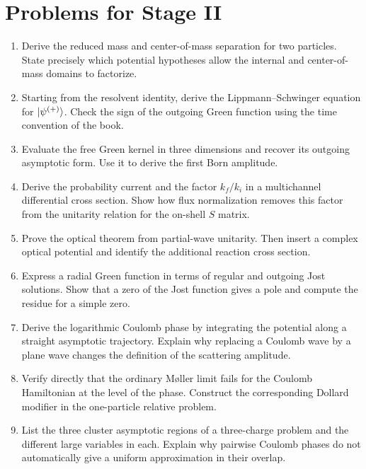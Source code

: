 \section{Problems for Stage II}
\label{problems:stage-II}

\begin{enumerate}[label=\textbf{II.\arabic*},leftmargin=*]
  \item Derive the reduced mass and center-of-mass separation for two
  particles.  State precisely which potential hypotheses allow the internal
  and center-of-mass domains to factorize.

  \item Starting from the resolvent identity, derive the Lippmann--Schwinger
  equation for $\lvert \psi^{(+)} \rangle$.  Check the sign of the outgoing Green
  function using the time convention of the book.

  \item Evaluate the free Green kernel in three dimensions and recover its
  outgoing asymptotic form.  Use it to derive the first Born amplitude.

  \item Derive the probability current and the factor $k_f/k_i$ in a
  multichannel differential cross section.  Show how flux normalization
  removes this factor from the unitarity relation for the on-shell $S$ matrix.

  \item Prove the optical theorem from partial-wave unitarity.  Then insert a
  complex optical potential and identify the additional reaction cross
  section.

  \item Express a radial Green function in terms of regular and outgoing Jost
  solutions.  Show that a zero of the Jost function gives a pole and compute
  the residue for a simple zero.

  \item Derive the logarithmic Coulomb phase by integrating the potential
  along a straight asymptotic trajectory.  Explain why replacing a Coulomb
  wave by a plane wave changes the definition of the scattering amplitude.

  \item Verify directly that the ordinary M{\o}ller limit fails for the
  Coulomb Hamiltonian at the level of the phase.  Construct the corresponding
  Dollard modifier in the one-particle relative problem.

  \item List the three cluster asymptotic regions of a three-charge problem
  and the different large variables in each.  Explain why pairwise Coulomb
  phases do not automatically give a uniform approximation in their overlap.


\end{enumerate}
